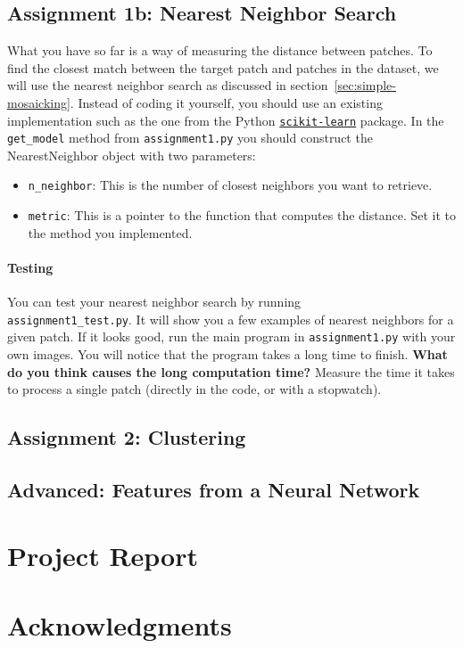 \documentclass[]{article}
\begin{document}
	\subsection{Assignment 1b: Nearest Neighbor Search}
		What you have so far is a way of measuring the distance between patches.
		To find the closest match between the target patch and patches in the dataset, we will use the nearest neighbor search as discussed in section~\ref{sec:simple-mosaicking}. 
		Instead of coding it yourself, you should use an existing implementation such as the one from the Python 
		\href{http://scikit-learn.org/stable/modules/neighbors.html}{\texttt{scikit-learn}} package.
		In the \verb|get_model| method from \verb|assignment1.py| you should construct the NearestNeighbor object with two parameters:
		\begin{itemize}
			\item \verb|n_neighbor|: This is the number of closest neighbors you want to retrieve. 
			\item \verb|metric|: This is a pointer to the function that computes the distance. 
			Set it to the method you implemented.
		\end{itemize}
	
		\paragraph{Testing}
		You can test your nearest neighbor search by running \\
		\verb|assignment1_test.py|. 
		It will show you a few examples of nearest neighbors for a given patch.
		If it looks good, run the main program in \verb|assignment1.py| with your own images.
		You will notice that the program takes a long time to finish. 
		\textbf{What do you think causes the long computation time?}
		Measure the time it takes to process a single patch (directly in the code, or with a stopwatch).
	
	\subsection{Assignment 2: Clustering}
		
		
	\subsection{Advanced: Features from a Neural Network}

\section{Project Report}

\section{Acknowledgments}
\end{document}
